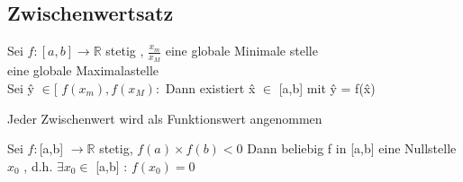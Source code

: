 \subsection{Zwischenwertsatz}
\begin{theorem}[ZWS]
Sei $f: [a,b] \rightarrow \mathbb{R}$ stetig , $\frac{x_m}{x_M}$ eine globale Minimale stelle \\ 
	 eine globale Maximalastelle\\	
	 Sei  \^{y}
	 $ \in $[ $f(x_m) , f(x_M) :$ Dann existiert  \^{x} $ \in $ [a,b] mit  \^{y}  = f(\^{x}) 
\end{theorem}
\begin{remark}
	Jeder Zwischenwert wird als Funktionswert angenommen
\end{remark}
\begin{theorem}[Nullstellen]
	Sei $f: $[a,b] $\rightarrow \mathbb{R}$ stetig, $f(a) \times f(b) < 0$
Dann beliebig f in [a,b] eine Nullstelle $x_0$ , d.h. $\exists x_0 \in $ [a,b] : $f(x_0)=0$
\end{theorem}
